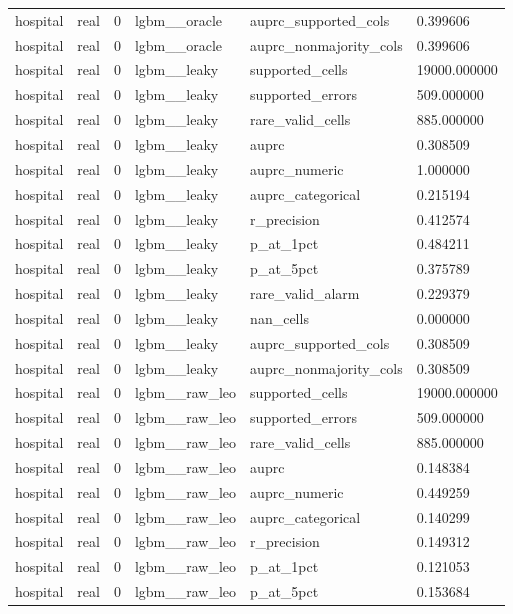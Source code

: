 \begin{tabular}{llllll}
hospital & real & 0 & lgbm\_\_oracle & auprc\_supported\_cols & 0.399606 \\
hospital & real & 0 & lgbm\_\_oracle & auprc\_nonmajority\_cols & 0.399606 \\
hospital & real & 0 & lgbm\_\_leaky & supported\_cells & 19000.000000 \\
hospital & real & 0 & lgbm\_\_leaky & supported\_errors & 509.000000 \\
hospital & real & 0 & lgbm\_\_leaky & rare\_valid\_cells & 885.000000 \\
hospital & real & 0 & lgbm\_\_leaky & auprc & 0.308509 \\
hospital & real & 0 & lgbm\_\_leaky & auprc\_numeric & 1.000000 \\
hospital & real & 0 & lgbm\_\_leaky & auprc\_categorical & 0.215194 \\
hospital & real & 0 & lgbm\_\_leaky & r\_precision & 0.412574 \\
hospital & real & 0 & lgbm\_\_leaky & p\_at\_1pct & 0.484211 \\
hospital & real & 0 & lgbm\_\_leaky & p\_at\_5pct & 0.375789 \\
hospital & real & 0 & lgbm\_\_leaky & rare\_valid\_alarm & 0.229379 \\
hospital & real & 0 & lgbm\_\_leaky & nan\_cells & 0.000000 \\
hospital & real & 0 & lgbm\_\_leaky & auprc\_supported\_cols & 0.308509 \\
hospital & real & 0 & lgbm\_\_leaky & auprc\_nonmajority\_cols & 0.308509 \\
hospital & real & 0 & lgbm\_\_raw\_leo & supported\_cells & 19000.000000 \\
hospital & real & 0 & lgbm\_\_raw\_leo & supported\_errors & 509.000000 \\
hospital & real & 0 & lgbm\_\_raw\_leo & rare\_valid\_cells & 885.000000 \\
hospital & real & 0 & lgbm\_\_raw\_leo & auprc & 0.148384 \\
hospital & real & 0 & lgbm\_\_raw\_leo & auprc\_numeric & 0.449259 \\
hospital & real & 0 & lgbm\_\_raw\_leo & auprc\_categorical & 0.140299 \\
hospital & real & 0 & lgbm\_\_raw\_leo & r\_precision & 0.149312 \\
hospital & real & 0 & lgbm\_\_raw\_leo & p\_at\_1pct & 0.121053 \\
hospital & real & 0 & lgbm\_\_raw\_leo & p\_at\_5pct & 0.153684 \\

\end{tabular}
